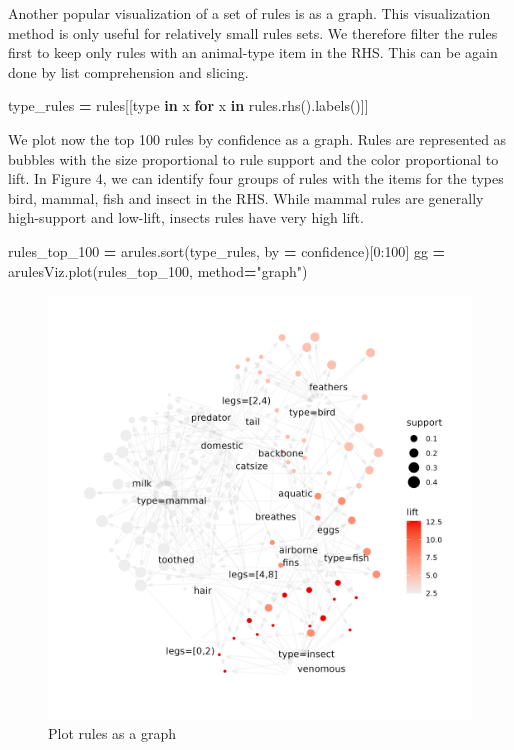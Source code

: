 \documentclass{article}
\newenvironment{Shaded}{\begin{snugshade}}{\end{snugshade}}
\newcommand{\ControlFlowTok}[1]{\textcolor[rgb]{0.13,0.29,0.53}{\textbf{#1}}}
\newcommand{\DecValTok}[1]{\textcolor[rgb]{0.00,0.00,0.81}{#1}}
\newcommand{\KeywordTok}[1]{\textcolor[rgb]{0.13,0.29,0.53}{\textbf{#1}}}
\newcommand{\NormalTok}[1]{#1}
\newcommand{\OperatorTok}[1]{\textcolor[rgb]{0.81,0.36,0.00}{\textbf{#1}}}
\newcommand{\StringTok}[1]{\textcolor[rgb]{0.31,0.60,0.02}{#1}}
\begin{document}
Another popular visualization of a set of rules is as a graph. This
visualization method is only useful for relatively small rules sets. We
therefore filter the rules first to keep only rules with an animal-type
item in the RHS. This can be again done by list comprehension and
slicing.

\begin{Shaded}
\begin{Highlighting}[]
\NormalTok{type\_rules }\OperatorTok{=}\NormalTok{ rules[[}\StringTok{\textquotesingle{}type\textquotesingle{}} \KeywordTok{in}\NormalTok{ x }\ControlFlowTok{for}\NormalTok{ x }\KeywordTok{in}\NormalTok{ rules.rhs().labels()]]}
\end{Highlighting}
\end{Shaded}

We plot now the top 100 rules by confidence as a graph. Rules are
represented as bubbles with the size proportional to rule support and
the color proportional to lift. In Figure 4, we can identify four groups
of rules with the items for the types bird, mammal, fish and insect in
the RHS. While mammal rules are generally high-support and low-lift,
insects rules have very high lift.

\begin{Shaded}
\begin{Highlighting}[]
\NormalTok{rules\_top\_100 }\OperatorTok{=}\NormalTok{ arules.sort(type\_rules, by }\OperatorTok{=} \StringTok{\textquotesingle{}confidence\textquotesingle{}}\NormalTok{)[}\DecValTok{0}\NormalTok{:}\DecValTok{100}\NormalTok{]}
\NormalTok{gg }\OperatorTok{=}\NormalTok{ arulesViz.plot(rules\_top\_100, method}\OperatorTok{=}\StringTok{"graph"}\NormalTok{)}
\end{Highlighting}
\end{Shaded}

\begin{figure}

{\centering \includegraphics[width=0.7\linewidth]{graph} 

}

\caption{Plot rules as a graph}\label{fig:graph}
\end{figure}
\end{document}
